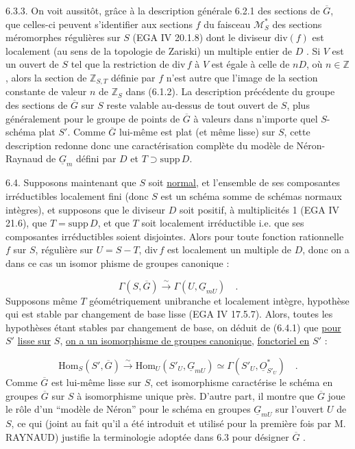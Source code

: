 6.3.3.  On voit aussitôt, grâce à la description générale 6.2.1 des sections de $\overline{G}$, que celles-ci peuvent s'identifier aux sections $f$ du faisceau $\mathcal{M}^*_S$ des sections méromorphes régulières sur $S$ (EGA IV 20.1.8) dont le diviseur $\mathrm{div}(f)$ est localement (au sens de la topologie de Zariski) un multiple entier de $D$ . Si $V$ est un ouvert de $S$ tel que la restriction de $\mathrm{div}\, f$ à $V$ est égale à celle de $nD$, où $n \in \mathbb{Z}$ , alors la section de $\mathbb{Z}_{S,T}$ définie par $f$ n'est autre que l'image de la section constante de valeur $n$ de $\mathbb{Z}_S$ dans (6.1.2). La description précédente du groupe des sections de $\overline{G}$ sur $S$ reste valable au-dessus de tout ouvert de $S$, plus généralement pour le groupe de points de $\overline{G}$ à valeurs dans n'importe quel $S$-schéma plat $S'$. Comme $\overline{G}$ lui-même est plat (et même lisse) sur $S$, cette description redonne donc une caractérisation complète du modèle de Néron-Raynaud de $\underline{G}_m$ défini par $D$ et $T \supset \mathrm{supp}\, D$.

6.4.  Supposons maintenant que $S$ soit \underline{normal}, et l'ensemble de ses composantes irréductibles localement fini (donc $S$ est un schéma somme de schémas normaux intègres), et supposons que le diviseur $D$ soit positif, à multiplicités 1 (EGA IV 21.6), que $T=\mathrm{supp}\, D$, et que $T$ soit localement irréductible i.e. que ses composantes irréductibles soient disjointes. Alors pour toute fonction rationnelle $f$ sur $S$, régulière sur $U = S-T$, $\mathrm{div}\, f$ est localement un multiple de $D$, donc on a dans ce cas un isomor%
phisme de groupes canonique :

\begin{equation}\tag{6.4.1}
\Gamma(S,\overline{G}) \overset{\sim}{\longrightarrow} \Gamma(U,\underline{G}_{mU}) \quad .
\end{equation}
Supposons même $T$ géométriquement unibranche et localement intègre, hypothèse qui est stable par changement de base lisse (EGA IV 17.5.7). Alors, toutes les hypothèses étant stables par changement de base, on déduit de (6.4.1) que \underline{pour} $S'$ \underline{lisse sur} $S$, \underline{on a un isomorphisme de groupes canonique}, \underline{fonctoriel en} $S'$ :

\begin{equation}\tag{6.4.2}
\mathrm{Hom}_S(S', \overline{G}) \overset{\sim}{\longrightarrow} \mathrm{Hom}_U(S'_U, \underline{G}_{mU}) \simeq \Gamma(S'_U , \underline{O}^*_{S'_U}) \quad .
\end{equation}
Comme $\overline{G}$ est lui-même lisse sur $S$, cet isomorphisme caractérise le schéma en groupes $\overline{G}$ sur $S$ à isomorphisme unique près. D'autre part, il montre que $\overline{G}$ joue le rôle d'un ``modèle de Néron'' pour le schéma en groupes $\underline{G}_{mU}$ sur l'ouvert $U$ de $S$, ce qui (joint au fait qu'il a été introduit et utilisé pour la première fois par M. RAYNAUD) justifie la terminologie adoptée dans 6.3 pour désigner $\overline{G}$ .

